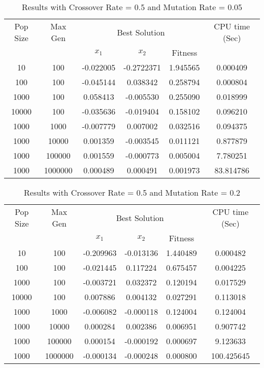 \documentclass[12pt]{article}
\begin{document}
 	\begin{table}[h!]
		\caption{Results with Crossover Rate = 0.5 and Mutation Rate = 0.05}
		\label{table:1}
		\centering
		\begin{tabular}{c c c c c c}
			\hline
			Pop Size & Max Gen & \multicolumn{3}{c}{Best Solution} & CPU time (Sec) \\
			& & $x_1$ & $x_2$ & Fitness & \\
			\hline
			10  & 100    &-0.022005&-0.2722371&1.945565&0.000409\\
			100 & 100    &-0.045144&0.038342&0.258794&0.000804\\
			1000& 100    &0.058413&-0.005530&0.255090&0.018999\\
			10000& 100    &-0.035636&-0.019404&0.158102&0.096210\\
			\hline
			1000  & 1000   &-0.007779&0.007002&0.032516&0.094375\\
			1000 & 10000  &0.001359&-0.003545&0.011121&0.877879\\
			1000& 100000 &0.001559&-0.000773&0.005004&7.780251\\
			1000& 1000000 &0.000489&0.000491&0.001973&83.814786\\
			\hline
		\end{tabular}
	\end{table}

  	\begin{table}[h!]
		\caption{Results with Crossover Rate = 0.5 and Mutation Rate = 0.2}
		\label{table:2}
		\centering
		\begin{tabular}{c c c c c c}
			\hline
			Pop Size & Max Gen & \multicolumn{3}{c}{Best Solution} & CPU time (Sec) \\
			& & $x_1$ & $x_2$ & Fitness & \\
			\hline
			10  & 100    &-0.209963&-0.013136&1.440489&0.000482\\
			100 & 100    &-0.021445&0.117224&0.675457&0.004225\\
			1000& 100    &-0.003721&0.032372&0.120194 &0.017529\\
			10000& 100    &0.007886&0.004132&0.027291&0.113018\\
			\hline
			1000  & 1000   &-0.006082&-0.000118&0.124004&0.124004\\
			1000 & 10000  &0.000284&0.002386&0.006951&0.907742\\
			1000& 100000 &0.000154&-0.000192&0.000697&9.123633\\
			1000& 1000000 &-0.000134&-0.000248&0.000800&100.425645\\
			\hline
		\end{tabular}
	\end{table}
\end{document}
